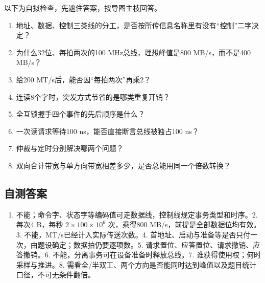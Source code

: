{\begin{recallcard}

以下为自拟检查，先遮住答案，按导图主枝回答。

\begin{enumerate}
\def\labelenumi{\arabic{enumi}.}
\tightlist
\item
  地址、数据、控制三类线的分工，是否按所传信息名称里有没有``控制''二字决定？
\item
  为什么32位、每拍两次的100 MHz总线，理想峰值是800 MB/s，而不是400 MB/s？
\item
  给200 MT/s后，能否因``每拍两次''再乘2？
\item
  连读8个字时，突发方式节省的是哪类重复开销？
\item
  全互锁握手四个事件的先后顺序是什么？
\item
  一次读请求等待100 ns，能否直接断言总线被独占100 ns？
\item
  仲裁与定时分别解决哪两个问题？
\item
  双向合计带宽与单方向带宽相差多少，是否总能用同一个倍数转换？
\end{enumerate}

\subsection{自测答案}\label{CO06-recall-answers}

\begin{enumerate}
\def\labelenumi{\arabic{enumi}.}
\tightlist
\item
  不能；命令字、状态字等编码值可走数据线，控制线规定事务类型和时序。2. 每次4 B，每秒 \(2\times100\times10^6\) 次，乘得800 MB/s，前提是全部数据位均有效。3. 不能，MT/s已经计入实际传送次数。4. 首地址、启动与准备等是否只付一次，由题设确定；数据拍仍要逐项数。5. 请求置位、应答置位、请求撤销、应答撤销。6. 不能，分离事务可在设备准备时释放总线。7. 谁获得使用权；何时采样与推进。8. 需看全/半双工、两个方向是否能同时达到峰值以及题目统计口径，不可无条件翻倍。
\end{enumerate}

\end{recallcard}}

